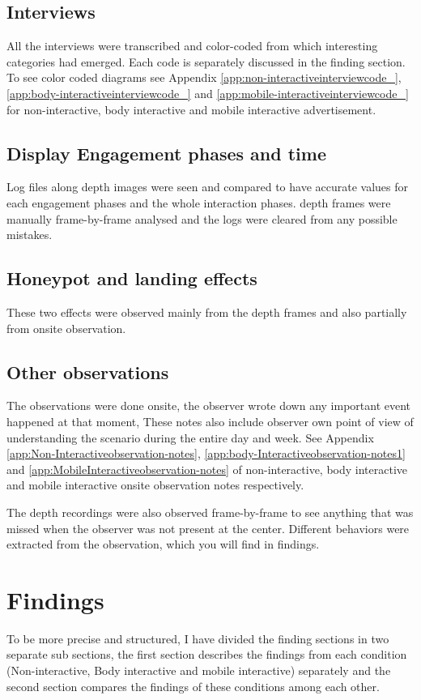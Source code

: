\subsection {Interviews} 
All the interviews were transcribed and color-coded from which interesting categories had emerged. Each code is separately discussed in the finding section. To see color coded diagrams see Appendix \ref{app:non-interactiveinterviewcode_}, \ref{app:body-interactiveinterviewcode_} and \ref{app:mobile-interactiveinterviewcode_} for non-interactive, body interactive and mobile interactive advertisement.



\subsection {Display Engagement phases and time} 
Log files along depth images were seen and compared to have accurate values for each engagement phases and the whole interaction phases. depth frames were manually frame-by-frame analysed and the logs were cleared from any possible mistakes.

\subsection {Honeypot and landing effects}
These two effects were observed mainly from the depth frames and also partially from onsite observation.

\subsection {Other observations}
The observations were done onsite, the observer wrote down any important event happened at that moment, These notes also include observer own point of view of understanding the scenario during the entire day and week. See Appendix \ref{app:Non-Interactiveobservation-notes}, \ref{app:body-Interactiveobservation-notes1} and \ref{app:MobileInteractiveobservation-notes} of non-interactive, body interactive and mobile interactive onsite observation notes respectively. 

The depth recordings were also observed frame-by-frame to see anything that was missed when the observer was not present at the center. Different behaviors were extracted from the observation, which you will find in findings.


\section{Findings}
To be more precise and structured, I have divided the finding sections in two separate sub sections, the first section describes the findings from each condition (Non-interactive, Body interactive and mobile interactive) separately and the second section compares the findings of these conditions among each other.


